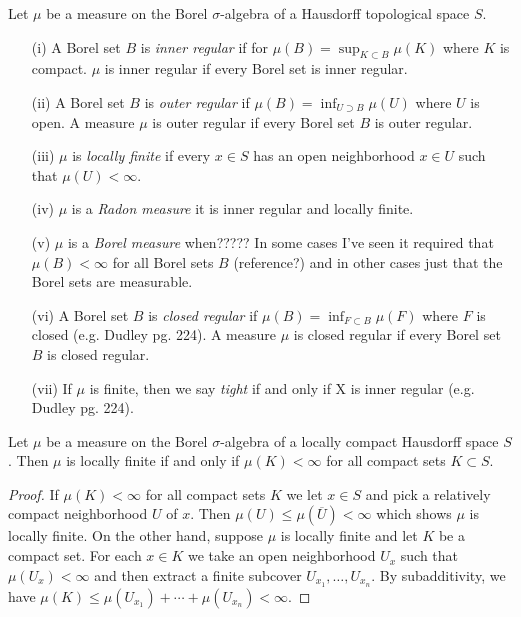 \begin{defn}Let $\mu$ be a measure on the Borel $\sigma$-algebra of a
Hausdorff topological space $S$.  
\begin{itemize}
\item[(i)] A Borel set $B$ is \emph{inner regular} if for
 $\mu(B) = \sup_{K \subset B} \mu(K)$ where $K$
  is compact. $\mu$ is inner regular if every Borel set is inner regular.
\item[(ii)]A Borel set $B$ is \emph{outer regular} if $\mu(B) = \inf_{U \supset B} \mu(U)$ where $U$
  is open.  A measure $\mu$ is outer regular if every Borel set
  $B$ is outer regular.
\item[(iii)] $\mu$ is \emph{locally finite} if every $x \in S$ has an
  open neighborhood $x \in U$ such that $\mu(U) < \infty$.
\item[(iv)] $\mu$ is a \emph{Radon measure} it is inner regular and
  locally finite.
\item[(v)] $\mu$ is a \emph{Borel measure} when?????  In some cases
  I've seen it required that $\mu(B) < \infty$ for all Borel sets $B$
  (reference?) and in other cases just that the Borel sets are measurable.
\item[(vi)]A Borel set  $B$ is \emph{closed regular} if $\mu(B) = \inf_{F \subset B} \mu(F)$ where $F$
  is closed (e.g. Dudley pg. 224).  A measure $\mu$ is closed regular
  if every Borel set $B$ is closed regular.
\item[(vii)] If $\mu$ is finite, then we say \emph{tight} if and only if
  X is inner regular (e.g. Dudley pg. 224).
\end{itemize}
\end{defn}

\begin{prop}Let $\mu$ be a measure on the Borel $\sigma$-algebra of a
  locally compact Hausdorff space $S$.  Then $\mu$ is locally finite
  if and only if $\mu(K) < \infty$ for all compact sets $K \subset S$.
\end{prop}
\begin{proof}
If $\mu(K) < \infty$ for all compact sets $K$ we let $x \in S$ and
pick a relatively compact neighborhood $U$ of $x$.  Then $\mu(U) \leq
\mu(\overline{U}) < \infty$ which shows $\mu$ is locally finite.  On
the other hand, suppose $\mu$ is locally finite and let $K$ be a
compact set.  For each $x \in K$ we take an open neighborhood $U_x$
such that $\mu(U_x) < \infty$ and then extract a finite subcover $U_{x_1},
\dotsc,U_{x_n}$.  By subadditivity, we have $\mu(K) \leq \mu(U_{x_1}) + \dotsb
+ \mu(U_{x_n}) < \infty$.
\end{proof}

